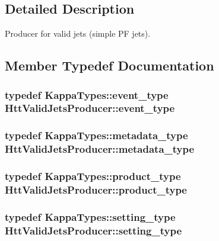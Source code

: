 \subsection{Detailed Description}
Producer for valid jets (simple PF jets). 

\subsection{Member Typedef Documentation}
\hypertarget{classHttValidJetsProducer_af051e11578ab0d12a1eff72d2a6913e7}{
\subsubsection[{event\_\-type}]{\setlength{\rightskip}{0pt plus 5cm}typedef KappaTypes::event\_\-type {\bf HttValidJetsProducer::event\_\-type}}}
\label{classHttValidJetsProducer_af051e11578ab0d12a1eff72d2a6913e7}
\hypertarget{classHttValidJetsProducer_ad913dcbe01bb00468ac3c24c29d4bf04}{
\subsubsection[{metadata\_\-type}]{\setlength{\rightskip}{0pt plus 5cm}typedef KappaTypes::metadata\_\-type {\bf HttValidJetsProducer::metadata\_\-type}}}
\label{classHttValidJetsProducer_ad913dcbe01bb00468ac3c24c29d4bf04}
\hypertarget{classHttValidJetsProducer_ac8070aad2e78408f5cbcf8a2936cbedb}{
\subsubsection[{product\_\-type}]{\setlength{\rightskip}{0pt plus 5cm}typedef KappaTypes::product\_\-type {\bf HttValidJetsProducer::product\_\-type}}}
\label{classHttValidJetsProducer_ac8070aad2e78408f5cbcf8a2936cbedb}
\hypertarget{classHttValidJetsProducer_aaf2948b591d092afb8c357192cb662b2}{
\subsubsection[{setting\_\-type}]{\setlength{\rightskip}{0pt plus 5cm}typedef KappaTypes::setting\_\-type {\bf HttValidJetsProducer::setting\_\-type}}}
